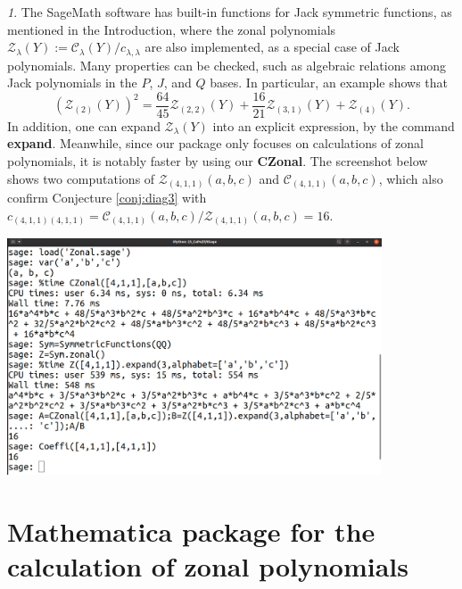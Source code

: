 \documentclass{mathincs}
\numberwithin{equation}{section}
\numberwithin{figure}{section}
\theoremstyle{plain}
\theoremstyle{definition}
\theoremstyle{remark}
\newtheorem{rem}[thm]{\protect\remarkname}
\theoremstyle{plain}
\theoremstyle{definition}
\theoremstyle{plain}
\theoremstyle{plain}
\providecommand{\remarkname}{Remark}
\begin{document}
\begin{rem}
The SageMath software has built-in functions for Jack symmetric
functions, as mentioned in the Introduction,
where the zonal polynomials
$\mathcal{Z}_{\lambda}(Y):=\mathcal{C}_\lambda(Y)/c_{\lambda,\lambda}$ are also
implemented, as a special case of Jack polynomials. Many properties can be
checked, such as algebraic relations among Jack polynomials in the $P$, $J$, and
$Q$ bases. In particular, an example shows that
\[
  \left(\mathcal{Z}_{(2)}(Y)\right)^2=\frac{64}{45}\mathcal{Z}_{(2, 2)}(Y) +
  \frac{16}{21}\mathcal{Z}_{(3, 1)}(Y) + \mathcal{Z}_{(4)}(Y).
\]
In addition, one can expand $\mathcal{Z}_{\lambda}(Y)$ into an explicit expression, by
the command \textbf{expand}. Meanwhile, since our package only focuses on
calculations of zonal polynomials, it is notably faster by using our
\textbf{CZonal}. The screenshot below shows two computations of
$\mathcal{Z}_{(4,1,1)}(a,b,c)$ and $\mathcal{C}_{(4,1,1)}(a,b,c)$,
which also confirm
Conjecture \ref{conj:diag3} with $c_{(4,1,1)(4,1,1)}=
\mathcal{C}_{(4,1,1)}(a,b,c)/\mathcal{Z}_{(4,1,1)}(a,b,c)=16$.
\begin{center}
\includegraphics[width=\textwidth, height=7cm]{Screenshot.jpg}
\end{center}
\end{rem}



\section{Mathematica package for the calculation of zonal polynomials}\label{sec:mma}
\end{document}
